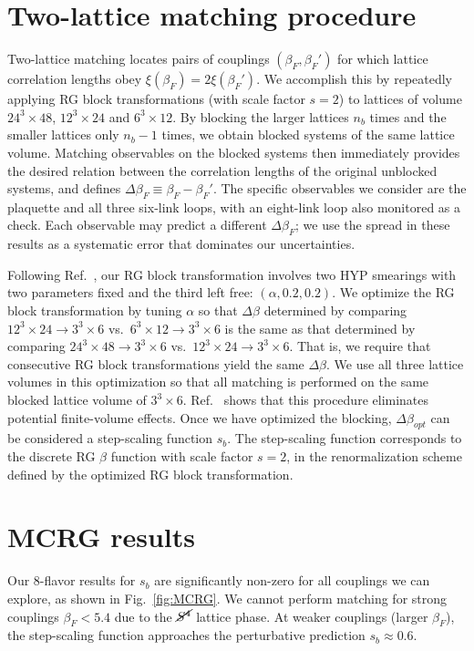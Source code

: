 \documentclass{PoS}
\newcommand{\al}{\ensuremath{\alpha} }
\newcommand{\be}{\ensuremath{\beta} }
\newcommand{\De}{\ensuremath{\Delta} }
\newcommand{\X}{\ensuremath{\!\times\!} }
\newcommand{\Sb}{\ensuremath{\cancel{S^4}} }
\newcommand{\refcite}[1]{Ref.~\cite{#1}}
\newcommand{\fig}[1]{Fig.~\ref{#1}}
\begin{document}
\section{\label{sec:MCRG}Two-lattice matching procedure} %
Two-lattice matching locates pairs of couplings $(\be_F, \be_F')$ for which lattice correlation lengths obey $\xi(\be_F) = 2\xi(\be_F')$.
We accomplish this by repeatedly applying RG block transformations (with scale factor $s = 2$) to lattices of volume $24^3\X48$, $12^3\X24$ and $6^3\X12$.
By blocking the larger lattices $n_b$ times and the smaller lattices only $n_b - 1$ times, we obtain blocked systems of the same lattice volume.
Matching observables on the blocked systems then immediately provides the desired relation between the correlation lengths of the original unblocked systems, and defines $\De\be_F \equiv \be_F - \be_F'$.
The specific observables we consider are the plaquette and all three six-link loops, with an eight-link loop also monitored as a check.
Each observable may predict a different $\De\be_F$; we use the spread in these results as a systematic error that dominates our uncertainties.

Following \refcite{Hasenfratz:2011xn}, our RG block transformation involves two HYP smearings with two parameters fixed and the third left free: $(\al, 0.2, 0.2)$.
We optimize the RG block transformation by tuning \al so that $\De\be$ determined by comparing $12^3\X24 \to 3^3\X6$ vs.\ $6^3\X12 \to 3^3\X6$ is the same as that determined by comparing $24^3\X48 \to 3^3\X6$ vs.\ $12^3\X24 \to 3^3\X6$.
That is, we require that consecutive RG block transformations yield the same $\De\be$.
We use all three lattice volumes in this optimization so that all matching is performed on the same blocked lattice volume of $3^3\X6$.
\refcite{Hasenfratz:2011xn} shows that this procedure eliminates potential finite-volume effects.
Once we have optimized the blocking, $\De\be_{opt}$ can be considered a step-scaling function $s_b$.
The step-scaling function corresponds to the discrete RG \be function with scale factor $s = 2$, in the renormalization scheme defined by the optimized RG block transformation.



\section{\label{sec:MCRG_results}MCRG results} %
Our 8-flavor results for $s_b$ are significantly non-zero for all couplings we can explore, as shown in \fig{fig:MCRG}.
We cannot perform matching for strong couplings $\be_F < 5.4$ due to the \Sb lattice phase.
At weaker couplings (larger $\be_F$), the step-scaling function approaches the perturbative prediction $s_b \approx 0.6$.
\end{document}

